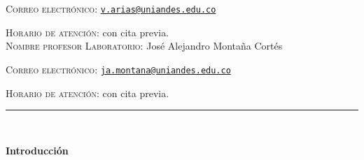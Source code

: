 \documentclass[letterpaper,10pt,onecolumn]{article}
\begin{document}
\noindent\textsc{Correo electr\'onico:}
\href{mailto:v.arias@uniandes.edu.co}{\nolinkurl{v.arias@uniandes.edu.co}}

\noindent\textsc{Horario de atenci\'on:} con cita previa. 
\\[-0.1cm]


\normalsize \noindent\textsc{Nombre profesor Laboratorio:}
Jos\'e Alejandro Monta\~na Cort\'es %

\noindent\textsc{Correo electr\'onico:}
\href{mailto:ja.montana@uniandes.edu.co}{\nolinkurl{ja.montana@uniandes.edu.co}}

\noindent\textsc{Horario de atenci\'on:} con cita previa. 
\\[-0.1cm]






\noindent\rule{\textwidth}{1pt}\\[-0.1cm]

\addtocounter{mysection}{1}

\noindent\textbf{\large {} \quad Introducci\'on}\\[-0.2cm]

\end{document}
